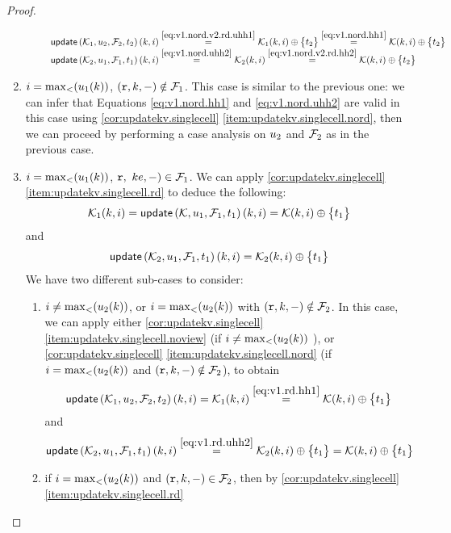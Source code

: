 \begin{proof}
\begin{enumerate}
\begin{enumerate}
\[\begin{array}{l}
\updateKV[\mkvs_1, \vi_2, \fp_2, \txid_2](\key, i) \stackrel{\cref{eq:v1.nord.v2.rd.uhh1}}{=} \mkvs_1(\key, i) \oplus \Set{\txid_2} \stackrel{\cref{eq:v1.nord.hh1}}{=} \mkvs(\key, i) \oplus \Set{\txid_2}\\
\updateKV[\mkvs_2,\vi_1,\fp_1, \txid_1](\key, i) \stackrel{\cref{eq:v1.nord.uhh2}}{=} \mkvs_2(\key, i) \stackrel{\cref{eq:v1.nord.v2.rd.hh2}}{=} \mkvs(\key, i) \oplus \Set{\txid_2}
\end{array}
\]
\end{enumerate}
\item $i = \max_{<}(u_1(k))$, $(\textnormal{\texttt r}, k, -) \notin \mathcal{F}_1$. This case is similar to the previous one: we can infer 
that Equations \cref{eq:v1.nord.hh1} and \cref{eq:v1.nord.uhh2} are valid in this case using \cref{cor:updatekv.singlecell}
\cref{item:updatekv.singlecell.nord}, then we can proceed by performing a case analysis on $u_2$ and $\mathcal{F}_2$ as in the previous case.
\item $i = \max_{<}(u_1(k))$, $\textnormal{\texttt r},\ ke, -) \in \mathcal{F}_1$. We can apply \cref{cor:updatekv.singlecell}\cref{item:updatekv.singlecell.rd} 
to deduce the following: 
\begin{equation}
\mkvs_1(\key, i) = \updateKV[\mkvs, \vi_1, \fp_1, \txid_1](\key, i) = \mkvs(\key, i) \oplus \Set{\txid_1}
\label{eq:v1.rd.hh1}
\end{equation}
and
\begin{equation}
\updateKV[\mkvs_2, \vi_1, \fp_1, \txid_1](\key, i) = \mkvs_2(\key, i) \oplus \Set{\txid_1}
\label{eq:v1.rd.uhh2}
\end{equation}
We have two different sub-cases to consider: 
\begin{enumerate}
\item $i \neq \max_{<}(u_2(k))$, or $i = \max_{<}(u_2(k))$ with $(\textnormal{\texttt r},k,-) \notin \mathcal{F}_2$. In this case, we can apply either 
\cref{cor:updatekv.singlecell}\cref{item:updatekv.singlecell.noview} (if $i \neq \max_{<}(u_2(k))$ ), or 
\cref{cor:updatekv.singlecell} \cref{item:updatekv.singlecell.nord} (if $i = \max_{<}(u_2(k))$ and $(\textnormal{\texttt r}, k, -) \notin \mathcal{F}_2$), 
to obtain 
\[
\updateKV[\mkvs_1, \vi_2, \fp_2, \txid_2](\key, i) = \mkvs_1(\key, i) \stackrel{\cref{eq:v1.rd.hh1}}{=} \mkvs(\key, i) \oplus \Set{\txid_1}
\]
and
\[
\updateKV[\mkvs_2, \vi_1, \fp_1, \txid_1](\key, i) \stackrel{\cref{eq:v1.rd.uhh2}}{=} \mkvs_2(\key, i) \oplus \Set{ \txid_1 } = 
\mkvs(\key, i) \oplus \Set{ \txid_1 }
\]
\item if $i = \max_{<}(u_2(k))$ and $(\textnormal{\texttt r}, k, -) \in \mathcal{F}_2$, then by \cref{cor:updatekv.singlecell}\cref{item:updatekv.singlecell.rd} 

\end{enumerate}
\end{enumerate}
\end{proof}
